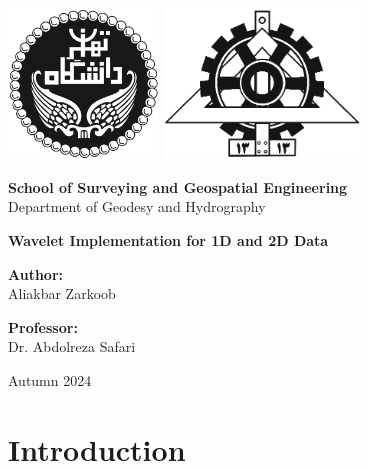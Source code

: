 \documentclass[12pt]{article}
\begin{document}
	
	\begin{titlepage}
		\begin{center}
			
			\includegraphics[height=4cm]{University_of_Tehran_Transparent_BW_logo.png} \hfill
			\includegraphics[height=4cm]{Fanni_Alt_BW_Logo.png}
			
			\vspace{1cm}
			
			\Large \textbf{School of Surveying and Geospatial Engineering}\\
			\large {Department of Geodesy and Hydrography}
			
			\vspace{3cm}
			
			\huge \textbf{Wavelet Implementation for 1D and 2D Data}
			
			\vspace{1.5cm}
			
			\Large \textbf{Author:}\\
			\Large Aliakbar Zarkoob
			
			\vspace{2cm}
			
			\Large \textbf{Professor:}\\
			Dr. Abdolreza Safari
			
			\vfill
			
			\large {Autumn 2024}
			
		\end{center}
	\end{titlepage}
	
	
	\section{Introduction}
	
\end{document}

